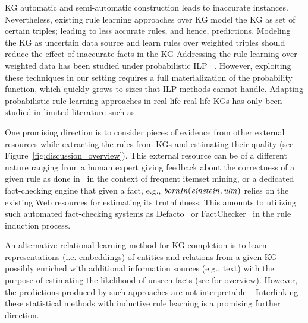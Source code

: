 KG automatic and semi-automatic construction leads to inaccurate instances. Nevertheless, existing rule learning approaches over KG model the KG as set of certain triples; leading to less accurate rules, and hence, predictions. Modeling the KG as uncertain data source and learn rules over weighted triples should reduce the effect of inaccurate facts in the KG Addressing the rule learning over weighted data has been studied under probabilistic ILP%
~\cite{probfoil,DBLP:conf/ijcai/RaedtDTBV15,DBLP:conf/clima/CorapiSIR11}.  
However, exploiting these techniques in our setting requires a full materialization of the probability function,
which quickly grows to sizes that ILP methods cannot handle. Adapting probabilistic rule learning approaches in real-life real-life KGs has only been studied in limited literature such as~\cite{DeRaedt:2015}.


One promising direction is to consider pieces of evidence from other external resources while extracting the rules from KGs and estimating their quality 
(see Figure~\ref{fig:discussion_overview}). This external resource can be of a different nature ranging from %
a human expert giving feedback about the correctness of a given rule as done in~\cite{Dzyuba2017} in the context of frequent itemset mining, or a dedicated fact-checking engine that given a fact, e.g., $\mathit{bornIn(einstein,ulm)}$ relies on the existing Web resources for estimating its truthfulness. This amounts to utilizing such automated fact-checking systems as Defacto~\cite{defacto} or FactChecker~\cite{factchecker} in the rule induction process. 

An alternative relational learning method for KG completion is to learn representations (i.e. embeddings) of entities and relations from a given KG possibly enriched with additional information sources (e.g., text) with the %
purpose of estimating the likelihood of unseen facts (see \cite{Wang2017} for overview). However, the
predictions produced by such approaches are not interpretable~\cite{Shakerin2018}. Interlinking these statistical methods with inductive rule learning is a promising further direction.

